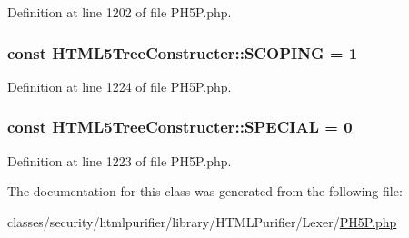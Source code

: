 Definition at line 1202 of file P\+H5\+P.\+php.

\hypertarget{classHTML5TreeConstructer_ae58e4a6b6175f5b0c373a6ec20706b88}{
\subsubsection[{S\+C\+O\+P\+I\+N\+G}]{\setlength{\rightskip}{0pt plus 5cm}const H\+T\+M\+L5\+Tree\+Constructer\+::\+S\+C\+O\+P\+I\+N\+G = 1}}\label{classHTML5TreeConstructer_ae58e4a6b6175f5b0c373a6ec20706b88}


Definition at line 1224 of file P\+H5\+P.\+php.

\hypertarget{classHTML5TreeConstructer_a7f4e05d3df089320a8b4cca78d04a176}{
\subsubsection[{S\+P\+E\+C\+I\+A\+L}]{\setlength{\rightskip}{0pt plus 5cm}const H\+T\+M\+L5\+Tree\+Constructer\+::\+S\+P\+E\+C\+I\+A\+L = 0}}\label{classHTML5TreeConstructer_a7f4e05d3df089320a8b4cca78d04a176}


Definition at line 1223 of file P\+H5\+P.\+php.



The documentation for this class was generated from the following file\+:\begin{DoxyCompactItemize}
\item 
classes/security/htmlpurifier/library/\+H\+T\+M\+L\+Purifier/\+Lexer/\hyperlink{PH5P_8php}{P\+H5\+P.\+php}\end{DoxyCompactItemize}
